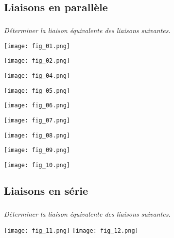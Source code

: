 \ifprof
\begin{multicols}{2}
\else
\begin{multicols}{2}
\fi


\subsection*{Liaisons en parallèle}

\subparagraph{}
\textit{Déterminer la liaison équivalente des liaisons suivantes.}

\begin{center}
\texttt{[image: fig\_01.png]}
\end{center}

\begin{center}
\texttt{[image: fig\_02.png]}
\end{center}

\begin{center}
\end{center}

\begin{center}
\texttt{[image: fig\_04.png]}
\end{center}

\begin{center}
\texttt{[image: fig\_05.png]}
\end{center}

\begin{center}
\texttt{[image: fig\_06.png]}
\end{center}

\begin{center}
\texttt{[image: fig\_07.png]}
\end{center}

\begin{center}
\texttt{[image: fig\_08.png]}
\end{center}

\begin{center}
\texttt{[image: fig\_09.png]}
\end{center}

\begin{center}
\texttt{[image: fig\_10.png]}
\end{center}


\subsection*{Liaisons en série}

\subparagraph{}
\textit{Déterminer la liaison équivalente des liaisons suivantes.}


\begin{center}
\texttt{[image: fig\_11.png]}
\hspace{1cm}
\texttt{[image: fig\_12.png]}
\end{center}

\ifprof
\end{multicols}
\else
\end{multicols}
\fi



